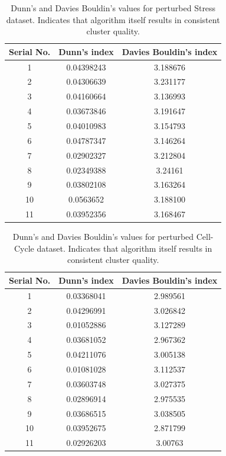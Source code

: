 \begin{table}
\centering
\begin{tabular}{|c|c|c|}
\hline
Serial No. & Dunn’s index  & Davies Bouldin’s index\\
\hline 
1 & 0.04398243 & 3.188676 \\
2 & 0.04306639 & 3.231177 \\
3 & 	0.04160664 & 3.136993 \\
4 & 	0.03673846 & 3.191647 \\
5 & 	0.04010983 & 3.154793 \\
6 & 	0.04787347 & 3.146264 \\
7 & 	0.02902327 & 3.212804 \\
8 & 	0.02349388 & 3.24161 \\
9 & 	0.03802108 & 3.163264 \\
10 & 	0.0563652 & 3.188100 \\
11 & 	0.03952356 & 3.168467 \\
\hline 
\end{tabular}
\caption{Dunn's and Davies Bouldin's values for perturbed Stress dataset. Indicates that algorithm itself results in consistent cluster quality.}
\label{tab:stress_only_perturb}
\end{table}

\begin{table}
\centering
\begin{tabular}{|c|c|c|}
\hline
Serial No. & Dunn’s index  & Davies Bouldin’s index\\
\hline
1 & 0.03368041 & 2.989561 \\
2 & 0.04296991 & 3.026842 \\
3 & 0.01052886 & 3.127289 \\
4 & 0.03681052 & 2.967362 \\
5 & 0.04211076 & 3.005138 \\
6 & 0.01081028 & 3.112537 \\
7 & 0.03603748 & 3.027375 \\
8 & 0.02896914 & 2.975535 \\
9 & 0.03686515 & 3.038505 \\
10 & 0.03952675 & 2.871799 \\
11 & 0.02926203 & 3.00763 \\
\hline 
\end{tabular}
\caption{Dunn's and Davies Bouldin's values for perturbed Cell-Cycle dataset. Indicates that algorithm itself results in consistent cluster quality.}
\label{tab:cellcycle_only_perturb}
\end{table}

